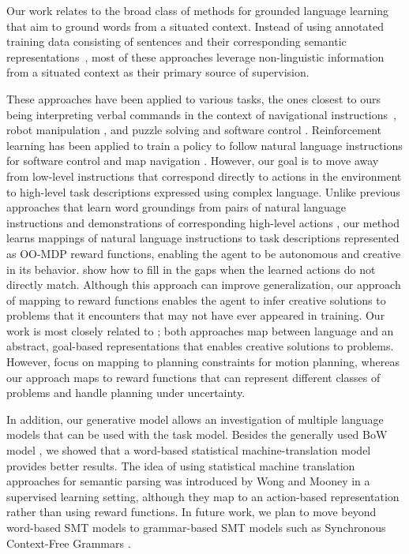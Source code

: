 \documentclass[conference]{IEEEtran}
\begin{document}
Our work relates to the broad class of methods for grounded language learning that aim to ground words from a situated context.
Instead of using annotated training data consisting of sentences and their corresponding semantic representations~\cite{kate06,wong07,zettlemoyer05,zettlemoyer09}, 
most of these approaches leverage non-linguistic information from a situated context as their primary source of supervision. 

These approaches have been applied to various tasks, the ones  closest to ours being interpreting verbal commands in the context of navigational instructions~\cite{vogel10,chen11,grubb11}, robot manipulation \cite{duvallet2013,tellex14,howard14},
and puzzle solving and software control \cite{bkr10}.
 Reinforcement learning has been applied to train a policy to follow natural language instructions for software control
and map navigation \cite{vogel10}. However, our goal is to move away from low-level instructions that correspond directly to actions in the environment
to high-level task descriptions expressed using complex language.
Unlike previous approaches that learn word groundings from pairs of
natural language instructions and demonstrations of corresponding high-level
actions \cite{tellex14,duvallet2013}, our method learns mappings
of natural language instructions to task descriptions represented as
OO-MDP reward functions, enabling the agent to be autonomous and creative
in its behavior.  \citet{misra14} show how to fill
in the gaps when the learned actions do not directly match.  Although
this approach can improve generalization, our approach of mapping to
reward functions enables the agent to infer creative solutions to
problems that it encounters that may not have ever appeared in
training.  Our work is most closely related to \citet{howard14}; both approaches map
between language and an abstract, goal-based representations that
enables creative solutions to problems. However, \citeauthor{howard14}
focus on mapping to planning constraints for motion planning, whereas our 
approach maps to reward functions that can represent different classes
of problems and handle planning under uncertainty.

In addition, our generative model allows an investigation of multiple
language models that can be used with the task model. Besides the
generally used BoW model \cite{bkr09,vogel10}, we showed that
a word-based statistical machine-translation model provides better
results. The idea of using statistical machine translation approaches
for semantic parsing was introduced by Wong and Mooney \cite{wong07}
in a supervised learning setting, although they map to an action-based
representation rather than using reward functions. In future work, we
plan to move beyond word-based SMT models to grammar-based SMT models
such as Synchronous Context-Free Grammars \cite{Wu1997}.
\end{document}
